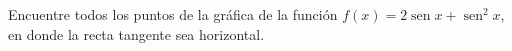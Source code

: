 \setcounter{enumi}{58}
\item Encuentre todos los puntos de la gráfica de la función $f(x) = 2 \operatorname{sen} x + \operatorname{sen}^2 x$, en donde la recta tangente sea horizontal.
